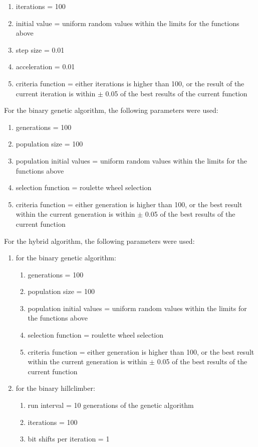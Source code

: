 \documentclass[conference]{IEEEtran}
\begin{document}
\begin{enumerate}
    \item iterations = 100
    \item initial value = uniform random values within the limits for the functions above
    \item step size = 0.01
    \item acceleration = 0.01
    \item criteria function = either iterations is higher than 100, or the result of the current iteration is within
    $\pm$ 0.05 of the best results of the current function
\end{enumerate}

For the binary genetic algorithm, the following parameters were used:

\begin{enumerate}
    \item generations = 100
    \item population size = 100
    \item population initial values = uniform random values within the limits for the functions above
    \item selection function = roulette wheel selection
    \item criteria function = either generation is higher than 100, or the best result within the current generation is
    within $\pm$ 0.05 of the best results of the current function
\end{enumerate}

For the hybrid algorithm, the following parameters were used:

\begin{enumerate}
    \item for the binary genetic algorithm:
    \begin{enumerate}
        \item generations = 100
        \item population size = 100
        \item population initial values = uniform random values within the limits for the functions above
        \item selection function = roulette wheel selection
        \item criteria function = either generation is higher than 100, or the best result within the current generation is
        within $\pm$ 0.05 of the best results of the current function
    \end{enumerate}
    \item for the binary hillclimber:
    \begin{enumerate}
        \item run interval = 10 generations of the genetic algorithm
        \item iterations = 100
        \item bit shifts per iteration = 1
    \end{enumerate}
\end{enumerate}
\end{document}

